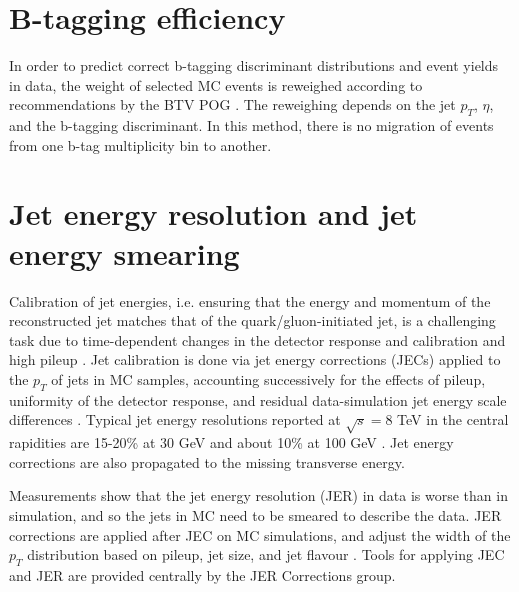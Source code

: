 \section{B-tagging efficiency}
In order to predict correct b-tagging discriminant distributions and event yields in data, the weight of selected MC events is reweighed according to recommendations by the BTV POG \cite{twiki_btag_SF_methods}. The reweighing depends on the jet $p_{T}$, $\eta$, and the b-tagging discriminant. In this method, there is no migration of events from one b-tag multiplicity bin to another.

\section{Jet energy resolution and jet energy smearing}
Calibration of jet energies, i.e. ensuring that the energy and momentum of the reconstructed jet matches that of the quark/gluon-initiated jet, is a challenging task due to time-dependent changes in the detector response and calibration and high pileup \cite{CMS-JME-13-004} \cite{proceedings-Agarwal:2022txa}. Jet calibration is done via jet energy corrections (JECs) applied to the $p_{T}$ of jets in MC samples, accounting successively for the effects of pileup, uniformity of the detector response, and residual data-simulation jet energy scale differences \cite{twiki_JetResolution_JEC}. Typical jet energy resolutions reported at $\sqrt{s} = 8$ TeV in the central rapidities are 15-20\% at 30 GeV and about 10\% at 100 GeV \cite{CMS-JME-13-004}. Jet energy corrections are also propagated to the missing transverse energy.

Measurements show that the jet energy resolution (JER) in data is worse than in simulation, and so the jets in MC need to be smeared to describe the data. JER corrections are applied after JEC on MC simulations, and adjust the width of the $p_{T}$ distribution based on pileup, jet size, and jet flavour \cite{twiki_JetResolution_JER}. Tools for applying JEC and JER are provided centrally by the JER Corrections group. 